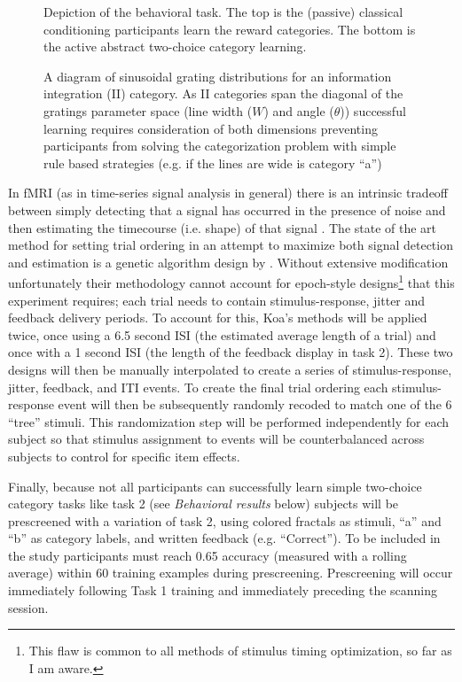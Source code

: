\documentclass[doc,12pt]{apa}        %
\begin{document}
\begin{figure}[tp]
	\label{fig:task}
	\caption{Depiction of the behavioral task. The top is the (passive) classical conditioning participants learn the reward categories.  The bottom is the active abstract two-choice category learning.}
\end{figure}

\begin{figure}[tp]
	\label{fig:II}
	\caption{A diagram of sinusoidal grating distributions for an information integration (II) category.  As II categories span the diagonal of the gratings parameter space (line width ($W$) and angle ($\theta$)) successful learning requires consideration of both dimensions preventing participants from solving the categorization problem with simple rule based strategies (e.g. if the lines are wide is category ``a'')}
\end{figure}

In fMRI (as in time-series signal analysis in general) there is an intrinsic tradeoff between simply detecting that a signal has occurred in the presence of noise and then estimating the timecourse (i.e. shape) of that signal \cite{Dale:1999p7901,Birn:2002p1777,Liu:2004p2141}.   The state of the art method for setting trial ordering in an attempt to maximize both signal detection and estimation is a genetic algorithm design by .  Without extensive modification unfortunately their methodology cannot account for epoch-style designs\footnote{This flaw is common to all methods of stimulus timing optimization, so far as I am aware.} that this experiment requires; each trial needs to contain stimulus-response, jitter and feedback delivery periods.  To account for this, Koa's methods will be applied twice, once using a 6.5 second ISI (the estimated average length of a trial) and once with a 1 second ISI (the length of the feedback display in task 2).  These two designs will then be manually interpolated to create a series of stimulus-response, jitter, feedback, and ITI events.  To create the final trial ordering each stimulus-response event will then be subsequently randomly recoded to match one of the 6 ``tree'' stimuli.  This randomization step will be performed independently for each subject so that stimulus assignment to events will be counterbalanced across subjects to control for specific item effects.  

Finally, because not all participants can successfully learn simple two-choice category tasks like task 2 (see \emph{Behavioral results} below) subjects will be prescreened with a variation of task 2, using colored fractals as stimuli, ``a'' and ``b'' as category labels, and written feedback (e.g. ``Correct'').  To be included in the study participants must reach 0.65 accuracy (measured with a rolling average) within 60 training examples during prescreening.  Prescreening will occur immediately following Task 1 training and immediately preceding the scanning session.
\end{document}
